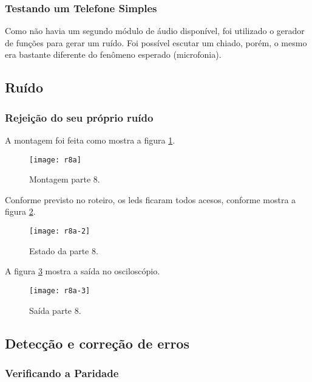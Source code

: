     \subsubsection{Testando um Telefone Simples}
        Como não havia um segundo módulo de áudio disponível, foi utilizado o gerador de funções para gerar um ruído. Foi possível escutar um chiado, porém, o mesmo era bastante diferente do fenômeno esperado (microfonia).
        
        \subsection{Ruído}
        \subsubsection{Rejeição do seu próprio ruído}
         A montagem foi feita como mostra a figura \ref{fig:r8a}.
         
              \begin{figure}[H]
                  \centering
                  \caption{Montagem parte 8.}
                  \texttt{[image: r8a]}
                  
                  \label{fig:r8a}
                \end{figure}
                
       Conforme previsto no roteiro, os leds ficaram todos acesos, conforme mostra a figura \ref{fig:r8a-2}.
     \begin{figure}[H]
         \centering
         \caption{Estado da parte 8.}
         \texttt{[image: r8a-2]}
         
         \label{fig:r8a-2}
        \end{figure}
        
        A figura \ref{fig:r8a-3} mostra a saída no osciloscópio.
        
    \begin{figure}[H]
        \centering
        \caption{Saída parte 8.}
        \texttt{[image: r8a-3]}
        
        \label{fig:r8a-3}
     \end{figure}   
     
     \subsection{Detecção e correção de erros}
     \subsubsection{Verificando a Paridade}
     
